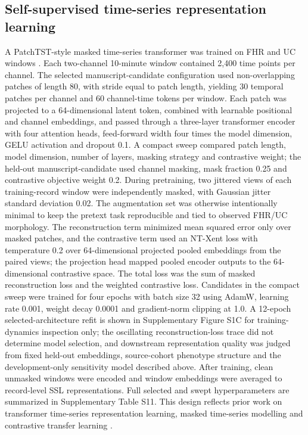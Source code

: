 \documentclass[utf8]{FrontiersinHarvard}
\begin{document}
\subsection{Self-supervised time-series representation learning}

A PatchTST-style masked time-series transformer was trained on FHR and UC windows \citep{nie2023}. Each two-channel 10-minute window contained 2,400 time points per channel. The selected manuscript-candidate configuration used non-overlapping patches of length 80, with stride equal to patch length, yielding 30 temporal patches per channel and 60 channel-time tokens per window. Each patch was projected to a 64-dimensional latent token, combined with learnable positional and channel embeddings, and passed through a three-layer transformer encoder with four attention heads, feed-forward width four times the model dimension, GELU activation and dropout 0.1. A compact sweep compared patch length, model dimension, number of layers, masking strategy and contrastive weight; the held-out manuscript-candidate used channel masking, mask fraction 0.25 and contrastive objective weight 0.2. During pretraining, two jittered views of each training-record window were independently masked, with Gaussian jitter standard deviation 0.02. The augmentation set was otherwise intentionally minimal to keep the pretext task reproducible and tied to observed FHR/UC morphology. The reconstruction term minimized mean squared error only over masked patches, and the contrastive term used an NT-Xent loss with temperature 0.2 over 64-dimensional projected pooled embeddings from the paired views; the projection head mapped pooled encoder outputs to the 64-dimensional contrastive space. The total loss was the sum of masked reconstruction loss and the weighted contrastive loss. Candidates in the compact sweep were trained for four epochs with batch size 32 using AdamW, learning rate 0.001, weight decay 0.0001 and gradient-norm clipping at 1.0. A 12-epoch selected-architecture refit is shown in Supplementary Figure S1C for training-dynamics inspection only; the oscillating reconstruction-loss trace did not determine model selection, and downstream representation quality was judged from fixed held-out embeddings, source-cohort phenotype structure and the development-only sensitivity model described above. After training, clean unmasked windows were encoded and window embeddings were averaged to record-level SSL representations. Full selected and swept hyperparameters are summarized in Supplementary Table S11. This design reflects prior work on transformer time-series representation learning, masked time-series modelling and contrastive transfer learning \citep{zerveas2021,nie2023,yue2022,zhang2022tfc,goswami2024moment}.
\end{document}
